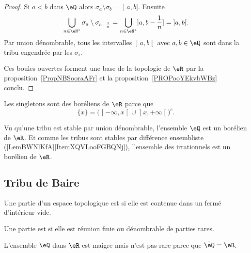 \begin{proof}
    Si \( a<b\) dans \( \eQ\) alors \( \sigma_a\setminus\sigma_b=\mathopen] a , b \mathclose]\). Ensuite
    \begin{equation}
        \bigcup_{n\in \eN^*}\sigma_a\setminus\sigma_{b-\frac{1}{ n }}=\bigcup_{n\in \eN^*}\mathopen] a , b-\frac{1}{ n } \mathclose]=\mathopen] a , b \mathclose[.
    \end{equation}
    Par union dénombrable, tous les intervalles \( \mathopen] a , b \mathclose[\) avec \( a,b\in \eQ\) sont dans la tribu engendrée par les \( \sigma_i\).

        Ces boules ouvertes forment une base de la topologie de \( \eR\) par la proposition~\ref{PropNBSooraAFr} et la proposition~\ref{PROPooYEkvbWBz} conclu.
\end{proof}

\begin{example}
    Les singletons sont des boréliens de \( \eR\) parce que
    \begin{equation}
    \{ x \}=\Big( \mathopen] -\infty , x \mathclose[\cup\mathopen] x , +\infty \mathclose[ \Big)^c.
    \end{equation}

    Vu qu'une tribu est stable par union dénombrable, l'ensemble \( \eQ\) est un borélien de \( \eR\). Et comme les tribus sont stables par différence ensembliste (\ref{LemBWNlKfA}\ref{ItemXQVLooFGBQNj}), l'ensemble des irrationnels est un borélien de \( \eR\).
\end{example}


\subsection{Tribu de Baire}

\begin{definition}
    Une partie d'un espace topologique est  si elle est contenue dans un fermé d'intérieur vide.

    Une partie est  si elle est réunion finie ou dénombrable de parties rares.
\end{definition}

\begin{example}
    L'ensemble \( \eQ\) dans \( \eR\) est maigre mais n'est pas rare parce que \( \bar\eQ=\eR\).
\end{example}

